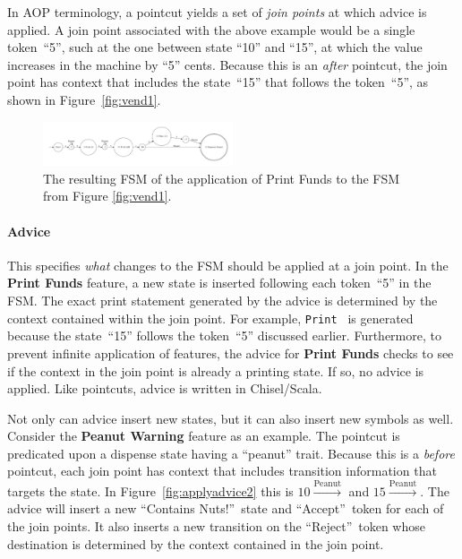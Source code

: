 \documentclass[conference]{IEEEtran}
\begin{document}
In AOP terminology, a pointcut yields a set of \emph{join points} at which advice is applied.  A join point associated with the above example would be a single token~``5'', such at the one between state ``10'' and ``15'', at which the value increases in the machine by ``5'' cents.  Because this is an \emph{after} pointcut, the join point has context that includes the state~``15'' that follows the token~``5'', as shown in Figure~\ref{fig:vend1}. 

\begin{figure}
    \centering
    \includegraphics[width=0.5\textwidth]{figures/vend2.pdf}
    \caption{The resulting FSM of the application of Print Funds to the FSM from Figure \ref{fig:vend1}.}
    \label{fig:applyadvice}
\end{figure}

\paragraph{Advice} This specifies \emph{what} changes to the FSM should be applied at a join point. In the \textbf{Print Funds} feature, a new state is inserted following each token~``5'' in the FSM. The exact print statement generated by the advice is determined by the context contained within the join point. For example, \texttt{Print } is generated because the state~``15'' follows the token~``5'' discussed earlier. Furthermore, to prevent infinite application of features, the advice for \textbf{Print Funds} checks to see if the context in the join point is already a printing state. If so, no advice is applied. Like pointcuts, advice is written in Chisel/Scala. 

Not only can advice insert new states, but it can also insert new symbols as well. Consider the \textbf{Peanut Warning} feature as an example. The pointcut is predicated upon a dispense state having a ``peanut'' trait. Because this is a \emph{before} pointcut, each join point has context that includes transition information that targets the state. In Figure~\ref{fig:applyadvice2} this is $10 \xrightarrow{\text{Peanut}}$ and $15 \xrightarrow{\text{Peanut}}$. The advice will insert a new ``Contains Nuts!''~state and ``Accept''~token for each of the join points. It also inserts a new transition on the ``Reject''~token whose destination is determined by the context contained in the join point.
\end{document}
